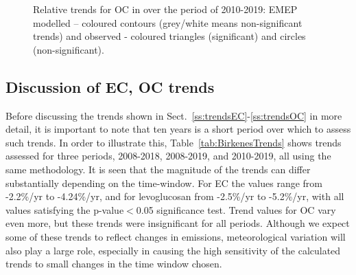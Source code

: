 \begin{figure}  %
\caption{Relative trends for OC in \pmfine over the period of 2010-2019: EMEP modelled -- coloured contours (grey/white means non-significant trends) and observed - coloured triangles (significant) and circles (non-significant).}
\label{fig:OCtrends}
\end{figure}

\subsection{Discussion of EC, OC trends}
\label{ss:DiscECOC}

Before discussing the trends shown in Sect.~\ref{ss:trendsEC}-\ref{ss:trendsOC} in  more detail, it is important to note that ten years is a short period over which to assess such trends. In order to illustrate this, Table~\ref{tab:BirkenesTrends} shows trends assessed for three periods, 2008-2018, 2008-2019, and 2010-2019, all using the same methodology. It is seen that the magnitude of the trends can differ substantially depending on the time-window. For EC the values range from -2.2\%/yr to \mbox{-4.24\%/yr}, and for levoglucosan from -2.5\%/yr to -5.2\%/yr, with all values satisfying the p-value$<$0.05 significance test. Trend values for OC vary even more, but these trends were insignificant for all periods. Although we expect some of these trends to reflect changes in emissions, meteorological variation will also play a large role, especially in causing the high sensitivity of the calculated trends to small changes in the time window chosen.



